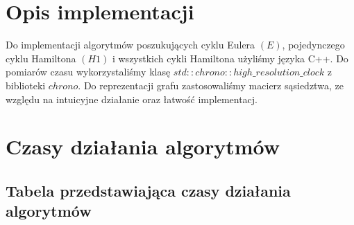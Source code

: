 \documentclass[polish,polish,a4paper]{article}
\begin{document}
\begin{spacing}{1.25}

\section{Opis implementacji }
 
 Do implementacji algorytmów poszukujących cyklu Eulera $(E)$, pojedynczego cyklu Hamiltona $(H1)$ i wszystkich cykli Hamiltona użyliśmy języka C++. Do pomiarów czasu wykorzystaliśmy klasę $std :: chrono :: high\_resolution\_clock$ z biblioteki $chrono$. Do reprezentacji grafu zastosowaliśmy macierz sąsiedztwa, ze względu na
 intuicyjne działanie oraz łatwość implementacj.

\section{Czasy działania algorytmów}


\begin{spacing}{1.3}
	
	{
		\centering
		\subsection*{Tabela przedstawiająca czasy działania algorytmów }
	}
	

\end{spacing}
\end{spacing}
\end{document}
